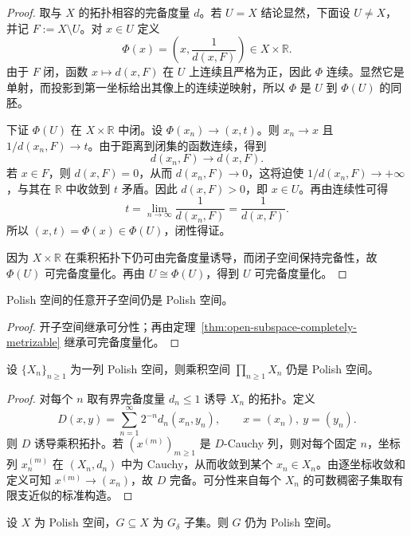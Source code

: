 \begin{proof}
取与 $X$ 的拓扑相容的完备度量 $d$。若 $U=X$ 结论显然，下面设 $U\neq X$，并记 $F:=X\setminus U$。对 $x\in U$ 定义
\[
\Phi(x)=\left(x,\frac{1}{d(x,F)}\right)\in X\times \mathbb R.
\]
由于 $F$ 闭，函数 $x\mapsto d(x,F)$ 在 $U$ 上连续且严格为正，因此 $\Phi$ 连续。显然它是单射，而投影到第一坐标给出其像上的连续逆映射，所以 $\Phi$ 是 $U$ 到 $\Phi(U)$ 的同胚。

下证 $\Phi(U)$ 在 $X\times\mathbb R$ 中闭。设 $\Phi(x_n)\to (x,t)$。则 $x_n\to x$ 且 $1/d(x_n,F)\to t$。由于距离到闭集的函数连续，得到
\[
d(x_n,F)\to d(x,F).
\]
若 $x\in F$，则 $d(x,F)=0$，从而 $d(x_n,F)\to 0$，这将迫使 $1/d(x_n,F)\to +\infty$，与其在 $\mathbb R$ 中收敛到 $t$ 矛盾。因此 $d(x,F)>0$，即 $x\in U$。再由连续性可得
\[
t=\lim_{n\to\infty}\frac{1}{d(x_n,F)}=\frac{1}{d(x,F)}.
\]
所以 $(x,t)=\Phi(x)\in \Phi(U)$，闭性得证。

因为 $X\times\mathbb R$ 在乘积拓扑下仍可由完备度量诱导，而闭子空间保持完备性，故 $\Phi(U)$ 可完备度量化。再由 $U\cong \Phi(U)$，得到 $U$ 可完备度量化。
\end{proof}

\begin{corollary}\label{cor:open-polish}
Polish 空间的任意开子空间仍是 Polish 空间。
\end{corollary}

\begin{proof}
开子空间继承可分性；再由定理~\ref{thm:open-subspace-completely-metrizable} 继承可完备度量化。
\end{proof}

\begin{proposition}\label{prop:countable-product-polish}
设 $\{X_n\}_{n\ge1}$ 为一列 Polish 空间，则乘积空间 $\prod_{n\ge1}X_n$ 仍是 Polish 空间。
\end{proposition}

\begin{proof}
对每个 $n$ 取有界完备度量 $d_n\le 1$ 诱导 $X_n$ 的拓扑。定义
\[
D(x,y)=\sum_{n=1}^{\infty}2^{-n}d_n(x_n,y_n),\qquad x=(x_n),\ y=(y_n).
\]
则 $D$ 诱导乘积拓扑。若 $(x^{(m)})_{m\ge1}$ 是 $D$-Cauchy 列，则对每个固定 $n$，坐标列 $x_n^{(m)}$ 在 $(X_n,d_n)$ 中为 Cauchy，从而收敛到某个 $x_n\in X_n$。由逐坐标收敛和定义可知 $x^{(m)}\to (x_n)$，故 $D$ 完备。可分性来自每个 $X_n$ 的可数稠密子集取有限支近似的标准构造。
\end{proof}

\begin{theorem}\label{thm:gdelta-polish}
设 $X$ 为 Polish 空间，$G\subseteq X$ 为 $G_\delta$ 子集。则 $G$ 仍为 Polish 空间。
\end{theorem}

